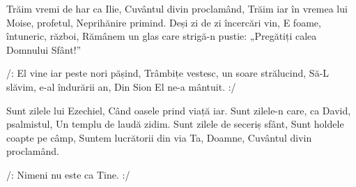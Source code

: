 \beginverse
Trăim vremi de har ca Ilie,
Cuvântul divin proclamând,
Trăim iar în vremea lui Moise, profetul,
Neprihănire primind.
Deși zi de zi încercări vin,
E foame, întuneric, război,
Rămânem un glas care strigă-n pustie:
„Pregătiți calea Domnului Sfânt!”
\endverse

\beginchorus
/: El vine iar peste nori pășind,
Trâmbițe vestesc, un soare strălucind,
Să-L slăvim, e-al îndurării an,
Din Sion El ne-a mântuit. :/
\endchorus

\beginverse
Sunt zilele lui Ezechiel,
Când oasele prind viață iar.
Sunt zilele-n care, ca David, psalmistul,
Un templu de laudă zidim.
Sunt zilele de seceriș sfânt,
Sunt holdele coapte pe câmp,
Suntem lucrătorii din via Ta, Doamne,
Cuvântul divin proclamând.
\endverse

\beginverse*
/: Nimeni nu este ca Tine. :/
\endverse
\endsong